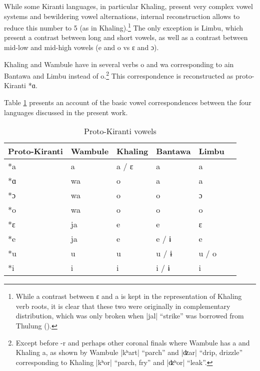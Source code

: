 \documentclass[oldfontcommands,oneside,a4paper,11pt]{article}
\newcommand{\ipa}[1]{{\phon\mbox{#1}}} %
\newcommand{\dhatu}[2]{|\ipa{#1}| ``#2''}
\begin{document}
While some Kiranti languages, in particular Khaling, present very complex vowel systems and bewildering vowel alternations, internal reconstruction allows to reduce this number to 5 (as in Khaling).\footnote{While a contrast between \ipa{ɛ} and \ipa{a} is kept in the representation of Khaling verb roots, it is clear that these two were originally in complementary distribution, which was only broken when \dhatu{jal}{strike} was borrowed from Thulung (\citealt[1110]{jacques12khaling}).} The only exception is Limbu, which present a contrast between long and short vowels, as well as a contrast between mid-low and mid-high vowels (\ipa{e} and \ipa{o} vs \ipa{ɛ} and \ipa{ɔ}).  

Khaling and Wambule have in several verbs \ipa{o} and \ipa{wa} corresponding to \ipa{a}in Bantawa and Limbu instead of \ipa{o}.\footnote{Except before \ipa{-r} and perhaps other coronal finals where Wambule has \ipa{a} and Khaling \ipa{a}, as shown by Wambule \dhatu{kʰart}{parch}	 	
and \dhatu{ʣar}{drip, drizzle}	corresponding to Khaling 	\dhatu{kʰor}{parch, fry} and \dhatu{ʣʰor}{leak}.} This correspondence is reconstructed as proto-Kiranti *\ipa{ɑ}.

Table \ref{tab:vowels} presents an account of the basic vowel correspondences between the four languages discussed in the present work.

\begin{table}[H]
\caption{Proto-Kiranti vowels} \centering \label{tab:vowels}
\begin{tabular}{llllll}
\toprule
Proto-Kiranti & Wambule & Khaling & Bantawa & Limbu \\
\midrule
\ipa{*a} & \ipa{a} & \ipa{a}  / \ipa{ɛ} & \ipa{a} & \ipa{a}  \\
\ipa{*ɑ} & \ipa{wa} & \ipa{o} & \ipa{a} & \ipa{a}  \\
\ipa{*ɔ} & \ipa{wa} & \ipa{o} & \ipa{o} & \ipa{ɔ}  \\
\ipa{*o} & \ipa{wa} & \ipa{o} & \ipa{o} & \ipa{o}  \\
\ipa{*ɛ} & \ipa{ja} & \ipa{e} & \ipa{e}  & \ipa{ɛ}  \\
\ipa{*e} & \ipa{ja} & \ipa{e} & \ipa{e}  / \ipa{ɨ} & \ipa{e}    \\
\ipa{*u} & \ipa{u} & \ipa{u} & \ipa{u} /  \ipa{ɨ} \  & \ipa{u} / \ipa{o} \\
\ipa{*i} & \ipa{i} & \ipa{i} & \ipa{i}  / \ipa{ɨ} & \ipa{i}  \\
\bottomrule
\end{tabular}
\end{table}
  
\end{document}
